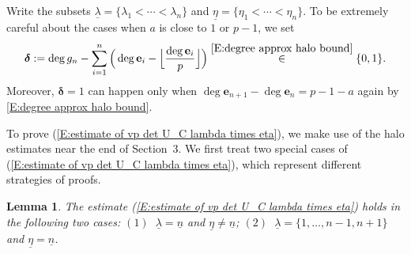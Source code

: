 \documentclass[12pt]{amsart}
\newtheorem{lemma}[subsection]{Lemma}
\theoremstyle{definition}
\numberwithin{equation}{subsection}
\def\bfe{\mathbf{e}}
\begin{document}
Write the subsets $\underline \lambda = \{\lambda_1< \cdots < \lambda_n\}$ and $\underline \eta = \{\eta_1< \cdots < \eta_n\}$. To be extremely careful about the cases when $a$ is close to $1$ or $p-1$, we set
\begin{equation}
\label{E:bold delta}
\boldsymbol \delta: = \deg g_n - \sum_{i= 1}^n \Big(\deg \bfe_i - \Big\lfloor \frac {\deg \bfe_i}p \Big \rfloor\Big) \stackrel{\eqref{E:degree approx halo bound}} \in \{0,1\}.
\end{equation} Moreover, 
$\boldsymbol{\delta}=1$ can happen only when $\deg \bfe_{n+1}-\deg \bfe_n=p-1-a$ again by \eqref{E:degree approx halo bound}. 

To prove (\ref{E:estimate of vp det U_C lambda times eta}), we make use of the halo estimates near the end of Section~3. We first treat two special cases of (\ref{E:estimate of vp det U_C lambda times eta}), which represent different strategies of proofs.

\begin{lemma}
\label{L:two special cases of estimate of vp det U_C lambda times eta}
The estimate (\ref{E:estimate of vp det U_C lambda times eta}) holds in the following two cases: $(1)~$ $\underline \lambda =\underline n$ and $\underline \eta\neq \underline n$; $(2)~$ $\underline \lambda=\{1,\dots, n-1,n+1 \}$ and $\underline \eta=\underline n$.
\end{lemma}
\end{document}
